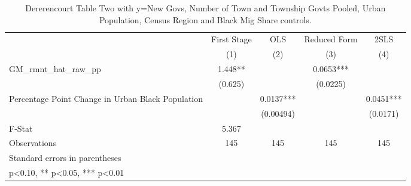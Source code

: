 \begin{table}[htbp]\centering
\def\sym#1{\ifmmode^{#1}\else\(^{#1}\)\fi}
\caption{Dererencourt Table Two with y=New Govs, Number of Town and Township Govts Pooled, Urban Population, Census Region and Black Mig Share controls.}
\begin{tabular}{l*{4}{c}}
\toprule
                    & First Stage   &         OLS   &Reduced Form   &        2SLS   \\
                    &\multicolumn{1}{c}{(1)}   &\multicolumn{1}{c}{(2)}   &\multicolumn{1}{c}{(3)}   &\multicolumn{1}{c}{(4)}   \\
\midrule
GM\_rmnt\_hat\_raw\_pp  &       1.448** &               &      0.0653***&               \\
                    &     (0.625)   &               &    (0.0225)   &               \\
\addlinespace
Percentage Point Change in Urban Black Population&               &      0.0137***&               &      0.0451***\\
                    &               &   (0.00494)   &               &    (0.0171)   \\
\midrule
F-Stat              &       5.367   &               &               &               \\
Observations        &         145   &         145   &         145   &         145   \\
\bottomrule
\multicolumn{5}{l}{\footnotesize Standard errors in parentheses}\\
\multicolumn{5}{l}{\footnotesize * p<0.10, ** p<0.05, *** p<0.01}\\
\end{tabular}
\end{table}
